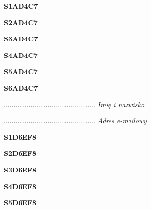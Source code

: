 \begin{turn}{90}\huge \textbf{S1AD4C7}\end{turn}

\begin{turn}{90}\huge \textbf{S2AD4C7}\end{turn}

\begin{turn}{90}\huge \textbf{S3AD4C7}\end{turn}

\begin{turn}{90}\huge \textbf{S4AD4C7}\end{turn}

\begin{turn}{90}\huge \textbf{S5AD4C7}\end{turn}

\begin{turn}{90}\huge \textbf{S6AD4C7}\end{turn}

\begin{turn}{90}\begin{minipage}{\linewidth} \vspace{20mm} ................................................  \textit{Imię i nazwisko}\end{minipage}\end{turn}

\begin{turn}{90}\begin{minipage}{\linewidth} \vspace{20mm} ................................................  \textit{Adres e-mailowy}\end{minipage}\end{turn}

\begin{turn}{90}\huge \textbf{S1D6EF8}\end{turn}

\begin{turn}{90}\huge \textbf{S2D6EF8}\end{turn}

\begin{turn}{90}\huge \textbf{S3D6EF8}\end{turn}

\begin{turn}{90}\huge \textbf{S4D6EF8}\end{turn}

\begin{turn}{90}\huge \textbf{S5D6EF8}\end{turn}

